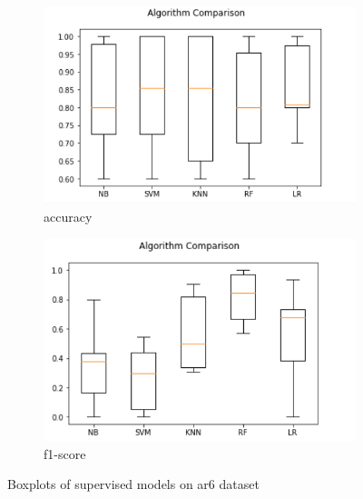 \begin{figure}[h!]
  \centering
  \begin{subfigure}[b]{0.4\linewidth}
    \includegraphics[width=\linewidth]{report/ar6.png}
    \caption{accuracy}
  \end{subfigure}
  \begin{subfigure}[b]{0.4\linewidth}
    \includegraphics[width=\linewidth]{report/ar6_f.png}
    \caption{f1-score}
  \end{subfigure}
  \caption{Boxplots of supervised models on ar6 dataset}
\end{figure}

